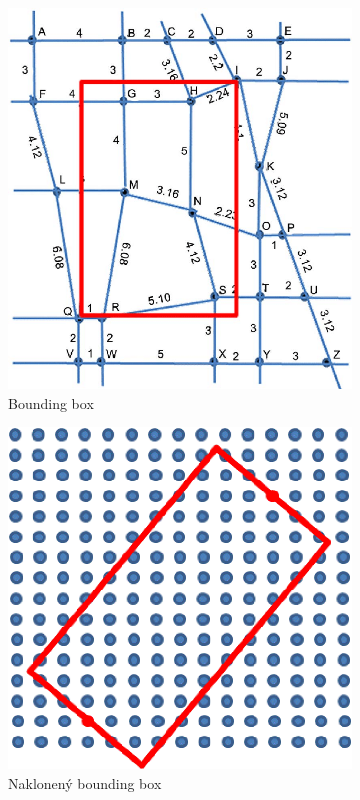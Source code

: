 \begin{figure}[H]
\centering
	\begin{subfigure}[b]{0.48\textwidth}
		\centering
 		\includegraphics[width=0.9\linewidth]{images/bounding-box}
		\caption{Bounding box}
		\label{fig:boundingBoxReal}
	\end{subfigure}
	\begin{subfigure}[b]{0.48\textwidth}
		\centering
		\includegraphics[width=0.9\linewidth]{images/bounding-box-rect}
			\caption{Naklonený bounding box}
		\label{fig:boundingBoxRect}
	\end{subfigure}
	\caption[Bounding box]{}
	\label{fig:boundingBox}
\end{figure}

